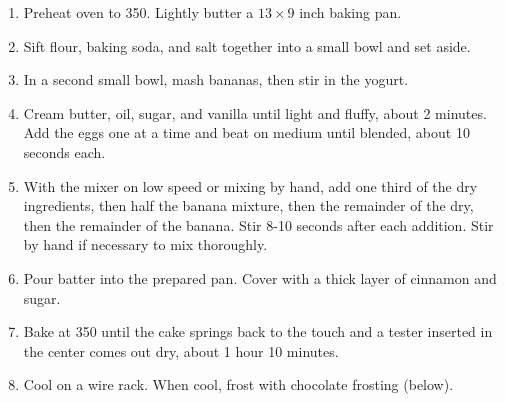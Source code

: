 
\begin{ingredients}
\end{ingredients}


\begin{recipe}
  \begin{enumerate}

  \item Preheat oven to 350\F.  Lightly butter a $13\times 9$ inch
    baking pan.

  \item Sift flour, baking soda, and salt together into a small bowl
    and set aside.

  \item In a second small bowl, mash bananas, then stir in the yogurt.

  \item Cream butter, oil, sugar, and vanilla until light and fluffy,
    about 2 minutes.  Add the eggs one at a time and beat on medium
    until blended, about 10 seconds each.

  \item With the mixer on low speed or mixing by hand, add one third
    of the dry ingredients, then half the banana mixture, then the
    remainder of the dry, then the remainder of the banana.  Stir 8-10
    seconds after each addition.  Stir by hand if necessary to mix
    thoroughly.

  \item Pour batter into the prepared pan.  Cover with a thick layer
    of cinnamon and sugar.

  \item Bake at {350\F} until the cake springs back to the touch and a
    tester inserted in the center comes out dry, about 1 hour 10
    minutes.

  \item Cool on a wire rack.  When cool, frost with chocolate frosting (below).

  \end{enumerate}
\end{recipe}


